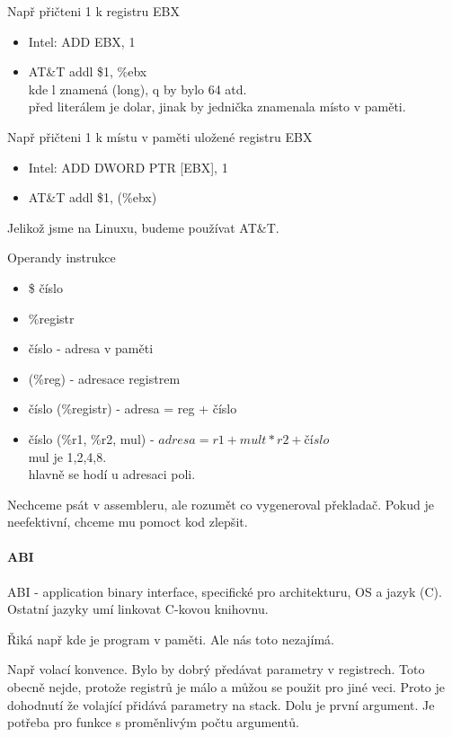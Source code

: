 Např přičteni 1 k registru EBX

\begin{itemize}
	\item Intel: ADD EBX, 1
	\item  AT\&T addl \$1, \%ebx \\
		kde l znamená (long), q by bylo 64 atd.\\
		před literálem je dolar, jinak by jednička znamenala místo v paměti.
\end{itemize}

Např přičteni 1 k místu v paměti uložené registru EBX
\begin{itemize}
	\item Intel: ADD DWORD PTR [EBX], 1
	\item  AT\&T addl \$1, (\%ebx)
\end{itemize}

\begin{agreement}
	Jelikož jsme na Linuxu, budeme používat AT\&T.
\end{agreement}

Operandy instrukce

\begin{itemize}
	\item \$ číslo
	\item \%registr
	\item číslo - adresa v paměti
	\item (\%reg) - adresace registrem
	\item číslo (\%registr) - adresa = reg + číslo
	\item číslo (\%r1, \%r2, mul) - $adresa = r1 + mult * r2 + číslo$ \\
		mul je 1,2,4,8.\\
		hlavně se hodí u adresaci poli.
\end{itemize}

Nechceme psát v assembleru, ale rozumět co vygeneroval překladač.
Pokud je neefektivní, chceme mu pomoct kod zlepšit.

\paragraph{ABI}
ABI - application binary interface, specifické pro architekturu, OS a jazyk (C).
Ostatní jazyky umí linkovat C-kovou knihovnu.

Řiká např kde je program v paměti. Ale nás toto nezajímá.

Např volací konvence.
Bylo by dobrý předávat parametry v registrech. Toto obecně nejde, protože registrů je málo a můžou se použit pro jiné veci.
Proto je dohodnutí že volající přidává parametry na stack. Dolu je první argument.
Je potřeba pro funkce s proměnlivým počtu argumentů.

